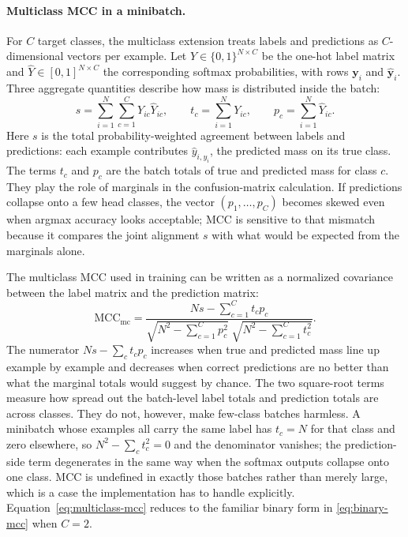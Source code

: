 \documentclass[11pt]{article}
\begin{document}
\paragraph{Multiclass MCC in a minibatch.}
For $C$ target classes, the multiclass extension treats labels and predictions as $C$-dimensional vectors per example. Let $Y\in\{0,1\}^{N\times C}$ be the one-hot label matrix and $\widehat{Y}\in[0,1]^{N\times C}$ the corresponding softmax probabilities, with rows $\mathbf{y}_i$ and $\hat{\mathbf{y}}_i$. Three aggregate quantities describe how mass is distributed inside the batch:
\begin{equation}
  s = \sum_{i=1}^{N}\sum_{c=1}^{C} Y_{ic}\widehat{Y}_{ic},
  \qquad
  t_c = \sum_{i=1}^{N} Y_{ic},
  \qquad
  p_c = \sum_{i=1}^{N} \widehat{Y}_{ic}.
  \label{eq:mcc-components}
\end{equation}
\noindent Here $s$ is the total probability-weighted agreement between labels and predictions: each example contributes $\hat{y}_{i,y_i}$, the predicted mass on its true class. The terms $t_c$ and $p_c$ are the batch totals of true and predicted mass for class $c$. They play the role of marginals in the confusion-matrix calculation. If predictions collapse onto a few head classes, the vector $(p_1,\ldots,p_C)$ becomes skewed even when argmax accuracy looks acceptable; MCC is sensitive to that mismatch because it compares the joint alignment $s$ with what would be expected from the marginals alone.

The multiclass MCC used in training can be written as a normalized covariance between the label matrix and the prediction matrix:
\begin{equation}
  \mathrm{MCC}_{\mathrm{mc}} =
  \frac{Ns - \sum_{c=1}^{C} t_c p_c}
       {\sqrt{N^2 - \sum_{c=1}^{C} p_c^2}\;
        \sqrt{N^2 - \sum_{c=1}^{C} t_c^2}}.
  \label{eq:multiclass-mcc}
\end{equation}
\noindent The numerator $Ns-\sum_c t_c p_c$ increases when true and predicted mass line up example by example and decreases when correct predictions are no better than what the marginal totals would suggest by chance. The two square-root terms measure how spread out the batch-level label totals and prediction totals are across classes. They do not, however, make few-class batches harmless. A minibatch whose examples all carry the same label has $t_{c}=N$ for that class and zero elsewhere, so $N^{2}-\sum_c t_c^{2}=0$ and the denominator vanishes; the prediction-side term degenerates in the same way when the softmax outputs collapse onto one class. MCC is undefined in exactly those batches rather than merely large, which is a case the implementation has to handle explicitly. Equation~\eqref{eq:multiclass-mcc} reduces to the familiar binary form in \eqref{eq:binary-mcc} when $C=2$.
\end{document}
